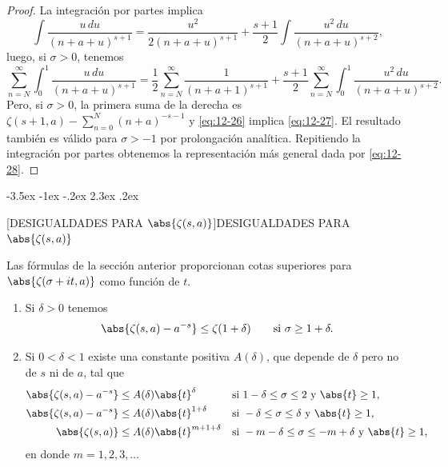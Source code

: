 \documentclass[12pt,a4paper]{book}
\makeatletter
\renewcommand\section{\@startsection{section}{1}{\z@}%
  {-3.5ex \@plus -1ex \@minus -.2ex}%
  {2.3ex \@plus .2ex}%
  {\normalfont\Large\bfseries\raggedright}}
\makeatother
\begin{document}
    \begin{proof}
        La integración por partes implica
        \begin{equation*}
            \int\frac{u\,du}{(n+a+u)^{s+1}}=\frac{u^{2}}{2(n+a+u)^{s+1}}+\frac{s+1}{2}\int\frac{u^{2}\,du}{(n+a+u)^{s+2}},
        \end{equation*}
        luego, si $\sigma>0$, tenemos
        \begin{equation*}
            \sum_{n=N}^{\infty}\int_{0}^{1}\frac{u\,du}{(n+a+u)^{s+1}}=\frac{1}{2}\sum_{n=N}^{\infty}\frac{1}{(n+a+1)^{s+1}}+\frac{s+1}{2}\sum_{n=N}^{\infty}\int_{0}^{1}\frac{u^{2}\,du}{(n+a+u)^{s+2}}.
        \end{equation*}
        Pero, si $\sigma>0$, la primera suma de la derecha es
        $\zeta(s+1,a)-\sum_{n=0}^{N}(n+a)^{-s-1}$ y \eqref{eq:12-26} implica
        \eqref{eq:12-27}. El resultado también es válido para $\sigma>-1$ por prolongación
        analítica. Repitiendo la integración por partes obtenemos la representación más
        general dada por \eqref{eq:12-28}.
    \end{proof}

    \section[DESIGUALDADES PARA \texorpdfstring{$\abs{\zeta(s,a)}$}{|ζ(s,a)|}]{DESIGUALDADES PARA \texorpdfstring{$\abs{\zeta(s,a)}$}{|ζ(s,a)|}}

    Las fórmulas de la sección anterior proporcionan cotas superiores para
    $\abs{\zeta(\sigma+it,a)}$ como función de $t$.

    \begin{teorema}\label{teo:12-23}
        \begin{enumerate}
            \item[(a)] Si $\delta>0$ tenemos
            \begin{equation}\label{eq:12-29}
                \abs{\zeta(s,a)-a^{-s}}\leq\zeta(1+\delta)\qquad\text{si }\sigma\geq1+\delta.
            \end{equation}
            \item[(b)] Si $0<\delta<1$ existe una constante positiva $A(\delta)$, que depende de
            $\delta$ pero no de $s$ ni de $a$, tal que
            \begin{align}
                \abs{\zeta(s,a)-a^{-s}}&\leq A(\delta)\abs{t}^{\delta}&&\text{si }1-\delta\leq\sigma\leq2\text{ y }\abs{t}\geq1,\label{eq:12-30}\\
                \abs{\zeta(s,a)-a^{-s}}&\leq A(\delta)\abs{t}^{1+\delta}&&\text{si }-\delta\leq\sigma\leq\delta\text{ y }\abs{t}\geq1,\label{eq:12-31}\\
                \abs{\zeta(s,a)}&\leq A(\delta)\abs{t}^{m+1+\delta}&&\text{si }-m-\delta\leq\sigma\leq-m+\delta\text{ y }\abs{t}\geq1,\label{eq:12-32}
            \end{align}
            en donde $m=1,2,3,\dots$
        \end{enumerate}
    \end{teorema}
\end{document}
